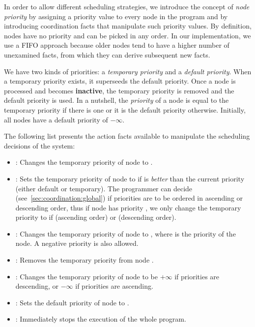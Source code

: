 
In order to allow different scheduling strategies, we introduce the concept of
\emph{node priority} by assigning a priority value to every node in the program
and by introducing coordination facts that manipulate such priority values.  By
definition, nodes have no priority and can be picked in any order. In our
implementation, we use a FIFO approach because older nodes tend to have a higher
number of unexamined facts, from which they can derive subsequent new facts.

We have two kinds of priorities: a \emph{temporary priority} and a \emph{default
priority}. When a temporary priority exists, it superseeds the default priority.
Once a node is processed and becomes \textbf{inactive}, the temporary priority
is removed and the default priority is used. In a nutshell, the \emph{priority}
of a node is equal to the temporary priority if there is one or it is the
default priority otherwise.  Initially, all nodes have a default priority of
$-\infty$.

The following list presents the action facts available to manipulate the
scheduling decisions of the system:

\begin{itemize}

   \item {}: Changes the temporary priority
      of node  to .


   \item {}: Sets the temporary priority of
      node  to  if  is \emph{better} than the current
      priority (either default or temporary). The programmer can decide
      (see~\ref{sec:coordination:global}) if priorities are to be ordered in
      ascending or descending order, thus if node  has priority
      , we only change the temporary priority to  if  (ascending order) or  (descending order).

   \item {}: Changes the temporary priority
      of node  to , where  is the priority of the
      node. A negative priority is also allowed.

   \item {}: Removes the temporary priority from node
   .

   \item {}: Changes the temporary priority of node
    to be $+\infty$ if priorities are descending, or $-\infty$ if
   priorities are ascending.

   \item {}: Sets the default
      priority of node  to .

   \item {}: Immediately stops the execution of the whole program.

\end{itemize}

